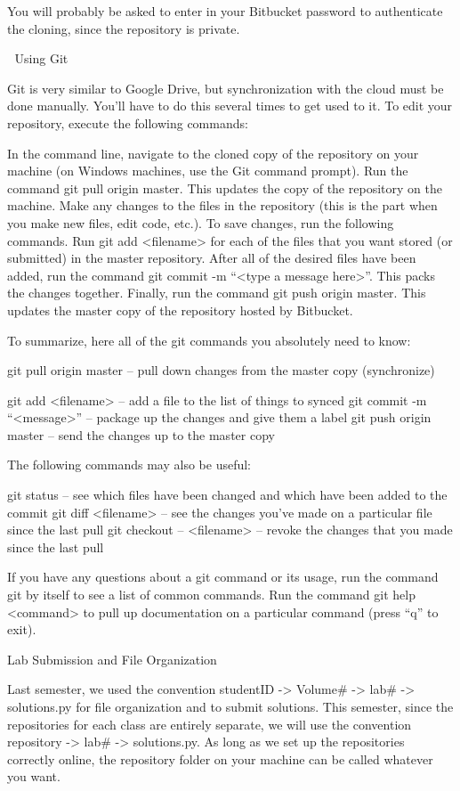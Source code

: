 You will probably be asked to enter in your Bitbucket password to authenticate the cloning, since the repository is private.


Using Git

Git is very similar to Google Drive, but synchronization with the cloud must be done manually. You’ll have to do this several times to get used to it. To edit your repository, execute the following commands:

In the command line, navigate to the cloned copy of the repository on your machine (on Windows machines, use the Git command prompt).
Run the command git pull origin master. This updates the copy of the repository on the machine.
Make any changes to the files in the repository (this is the part when you make new files, edit code, etc.).
To save changes, run the following commands.
Run git add <filename> for each of the files that you want stored (or submitted) in the master repository.
After all of the desired files have been added, run the command git commit -m “<type a message here>”. This packs the changes together.
Finally, run the command git push origin master. This updates the master copy of the repository hosted by Bitbucket.

To summarize, here all of the git commands you absolutely need to know:

git pull origin master    – pull down changes from the master copy (synchronize)

git add <filename>      – add a file to the list of things to synced
git commit -m “<message>”   – package up the changes and give them a label
git push origin master    – send the changes up to the master copy

The following commands may also be useful:

git status        – see which files have been changed and which have been
   added to the commit
git diff <filename>       – see the changes you’ve made on a particular file since
   the last pull
git checkout -- <filename>    – revoke the changes that you made since the last pull

If you have any questions about a git command or its usage, run the command git by itself to see a list of common commands. Run the command git help <command> to pull up documentation on a particular command (press “q” to exit).


Lab Submission and File Organization

Last semester, we used the convention studentID -> Volume\# -> lab\# -> solutions.py for file organization and to submit solutions. This semester, since the repositories for each class are entirely separate, we will use the convention repository -> lab\# -> solutions.py. As long as we set up the repositories correctly online, the repository folder on your machine can be called whatever you want.

